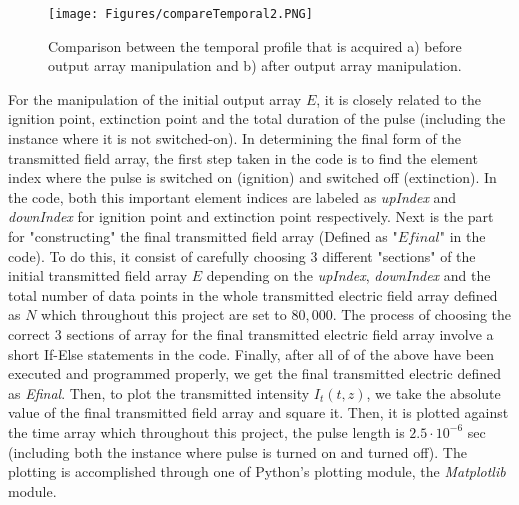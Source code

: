 \begin{figure}
    \centering
    \texttt{[image: Figures/compareTemporal2.PNG]}
    \caption{Comparison between the temporal profile that is acquired a) before output array manipulation and b) after output array manipulation.}
    \label{fig: compare temporal}
\end{figure}

For the manipulation of the initial output array $E$, it is closely related to the ignition point, extinction point and the total duration of the pulse (including the instance where it is not switched-on). In determining the final form of the transmitted field array, the first step taken in the code is to find the element index where the pulse is switched on (ignition) and switched off (extinction). In the code, both this important element indices are labeled as \textit{upIndex} and \textit{downIndex} for ignition point and extinction point respectively. Next is the part for "constructing" the final transmitted field array (Defined as "$Efinal$" in the code). To do this, it consist of carefully choosing 3 different "sections" of the initial transmitted field array $E$ depending on the \textit{upIndex}, \textit{downIndex} and the total number of data points in the whole transmitted electric field array defined as $N$ which throughout this project are set to $80,000$. The process of choosing the correct 3 sections of array for the final transmitted electric field array involve a short If-Else statements in the code. Finally, after all of of the above have been executed and programmed properly, we get the final transmitted electric defined as \textit{Efinal}. Then, to plot the transmitted intensity $I_{t}(t, z)$, we take the absolute value of the final transmitted field array and square it. Then, it is plotted against the time array which throughout this project, the pulse length is $2.5 \cdot 10^{-6}$ sec (including both the instance where pulse is turned on and turned off). The plotting is accomplished through one of Python's plotting module, the \textit{Matplotlib} module.


